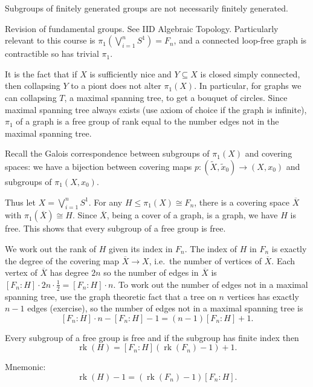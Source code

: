 \documentclass[a4paper]{article}
\DeclareMathOperator{\rk}{rk} %
\begin{document}
\begin{remark}
  Subgroups of finitely generated groups are not necessarily finitely generated.
\end{remark}

Revision of fundamental groups. See IID Algebraic Topology. Particularly relevant to this course is \(\pi_1(\bigvee_{i = 1}^n S^1) = F_n\), and a connected loop-free graph is contractible so has trivial \(\pi_1\).

It is the fact that if \(X\) is sufficiently nice and \(Y \subseteq X\) is closed simply connected, then collapsing \(Y\) to a piont does not alter \(\pi_1(X)\). In particular, for graphs we can collapsing \(T\), a maximal spanning tree, to get a bouquet of circles. Since maximal spanning tree always exists (use axiom of choice if the graph is infinite), \(\pi_1\) of a graph is a free group of rank equal to the number edges not in the maximal spanning tree.

Recall the Galois correspondence between subgroups of \(\pi_1(X)\) and covering spaces: we have a bijection between covering maps \(p: (\tilde X, \tilde x_0) \to (X, x_0)\) and subgroups of \(\pi_1(X, x_0)\).

Thus let \(X = \bigvee_{i = 1}^n S^1\). For any \(H \leq \pi_1(X) \cong F_n\), there is a covering space \(\overline X\) with \(\pi_1(\overline X) \cong H\). Since \(\overline X\), being a cover of a graph, is a graph, we have \(H\) is free. This shows that every subgroup of a free group is free.

We work out the rank of \(H\) given its index in \(F_n\). The index of \(H\) in \(F_n\) is exactly the degree of the covering map \(\overline X \to X\), i.e.\ the number of vertices of \(\overline X\). Each vertex of \(\overline X\) has degree \(2n\) so the number of edges in \(\overline X\) is \([F_n: H] \cdot 2n \cdot \frac{1}{2} = [F_n : H] \cdot n\). To work out the number of edges not in a maximal spanning tree, use the graph theoretic fact that a tree on \(n\) vertices has exactly \(n - 1\) edges (exercise), so the number of edges not in a maximal spanning tree is
\[
  [F_n: H] \cdot n - [F_n : H] - 1 = (n - 1) [F_n : H] + 1.
\]

\begin{theorem}
  Every subgroup of a free group is free and if the subgroup has finite index then
  \[
    \rk(H) = [F_n: H] (\rk(F_n) - 1) + 1.
  \]
\end{theorem}
Mnemonic:
\[
  \rk(H) - 1 = (\rk(F_n) - 1) [F_n : H].
\]
\end{document}
